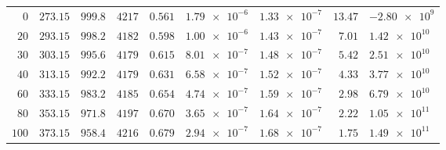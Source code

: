 \begin{minipage}{\linewidth}
\begin{tabularx}{\linewidth}{@{}r r r r r r r r X@{}}
$0$   & $273.15$ & $999.8$ & $4217$ & $0.561$  & $\num{1.79e-6}$ & $\num{1.33e-7}$ & $13.47$ & $\num{-2.80e9}$ \\
$20$  & $293.15$ & $998.2$ & $4182$ & $0.598$  & $\num{1.00e-6}$ & $\num{1.43e-7}$ & $7.01$  & $\num{1.42e10}$ \\
$30$  & $303.15$ & $995.6$ & $4179$ & $0.615$  & $\num{8.01e-7}$ & $\num{1.48e-7}$ & $5.42$  & $\num{2.51e10}$ \\
$40$  & $313.15$ & $992.2$ & $4179$ & $0.631$  & $\num{6.58e-7}$ & $\num{1.52e-7}$ & $4.33$  & $\num{3.77e10}$ \\
$60$  & $333.15$ & $983.2$ & $4185$ & $0.654$  & $\num{4.74e-7}$ & $\num{1.59e-7}$ & $2.98$  & $\num{6.79e10}$ \\
$80$  & $353.15$ & $971.8$ & $4197$ & $0.670$  & $\num{3.65e-7}$ & $\num{1.64e-7}$ & $2.22$  & $\num{1.05e11}$ \\
$100$ & $373.15$ & $958.4$ & $4216$ & $0.679$  & $\num{2.94e-7}$ & $\num{1.68e-7}$ & $1.75$  & $\num{1.49e11}$ \\
\bottomrule
\end{tabularx}
\end{minipage}
\par\smallskip

